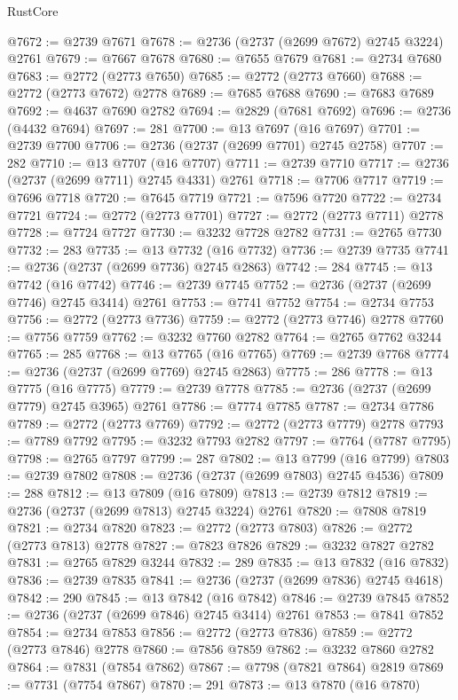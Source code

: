 \begin{lexlean}{RustCore}
\begin{coremodule}
@7672 := @2739 @7671
@7678 := @2736 (@2737 (@2699 @7672) @2745 @3224) @2761
@7679 := @7667 @7678
@7680 := @7655 @7679
@7681 := @2734 @7680
@7683 := @2772 (@2773 @7650)
@7685 := @2772 (@2773 @7660)
@7688 := @2772 (@2773 @7672) @2778
@7689 := @7685 @7688
@7690 := @7683 @7689
@7692 := @4637 @7690 @2782
@7694 := @2829 (@7681 @7692)
@7696 := @2736 (@4432 @7694)
@7697 := 281
@7700 := @13 @7697 (@16 @7697)
@7701 := @2739 @7700
@7706 := @2736 (@2737 (@2699 @7701) @2745 @2758)
@7707 := 282
@7710 := @13 @7707 (@16 @7707)
@7711 := @2739 @7710
@7717 := @2736 (@2737 (@2699 @7711) @2745 @4331) @2761
@7718 := @7706 @7717
@7719 := @7696 @7718
@7720 := @7645 @7719
@7721 := @7596 @7720
@7722 := @2734 @7721
@7724 := @2772 (@2773 @7701)
@7727 := @2772 (@2773 @7711) @2778
@7728 := @7724 @7727
@7730 := @3232 @7728 @2782
@7731 := @2765 @7730
@7732 := 283
@7735 := @13 @7732 (@16 @7732)
@7736 := @2739 @7735
@7741 := @2736 (@2737 (@2699 @7736) @2745 @2863)
@7742 := 284
@7745 := @13 @7742 (@16 @7742)
@7746 := @2739 @7745
@7752 := @2736 (@2737 (@2699 @7746) @2745 @3414) @2761
@7753 := @7741 @7752
@7754 := @2734 @7753
@7756 := @2772 (@2773 @7736)
@7759 := @2772 (@2773 @7746) @2778
@7760 := @7756 @7759
@7762 := @3232 @7760 @2782
@7764 := @2765 @7762 @3244
@7765 := 285
@7768 := @13 @7765 (@16 @7765)
@7769 := @2739 @7768
@7774 := @2736 (@2737 (@2699 @7769) @2745 @2863)
@7775 := 286
@7778 := @13 @7775 (@16 @7775)
@7779 := @2739 @7778
@7785 := @2736 (@2737 (@2699 @7779) @2745 @3965) @2761
@7786 := @7774 @7785
@7787 := @2734 @7786
@7789 := @2772 (@2773 @7769)
@7792 := @2772 (@2773 @7779) @2778
@7793 := @7789 @7792
@7795 := @3232 @7793 @2782
@7797 := @7764 (@7787 @7795)
@7798 := @2765 @7797
@7799 := 287
@7802 := @13 @7799 (@16 @7799)
@7803 := @2739 @7802
@7808 := @2736 (@2737 (@2699 @7803) @2745 @4536)
@7809 := 288
@7812 := @13 @7809 (@16 @7809)
@7813 := @2739 @7812
@7819 := @2736 (@2737 (@2699 @7813) @2745 @3224) @2761
@7820 := @7808 @7819
@7821 := @2734 @7820
@7823 := @2772 (@2773 @7803)
@7826 := @2772 (@2773 @7813) @2778
@7827 := @7823 @7826
@7829 := @3232 @7827 @2782
@7831 := @2765 @7829 @3244
@7832 := 289
@7835 := @13 @7832 (@16 @7832)
@7836 := @2739 @7835
@7841 := @2736 (@2737 (@2699 @7836) @2745 @4618)
@7842 := 290
@7845 := @13 @7842 (@16 @7842)
@7846 := @2739 @7845
@7852 := @2736 (@2737 (@2699 @7846) @2745 @3414) @2761
@7853 := @7841 @7852
@7854 := @2734 @7853
@7856 := @2772 (@2773 @7836)
@7859 := @2772 (@2773 @7846) @2778
@7860 := @7856 @7859
@7862 := @3232 @7860 @2782
@7864 := @7831 (@7854 @7862)
@7867 := @7798 (@7821 @7864) @2819
@7869 := @7731 (@7754 @7867)
@7870 := 291
@7873 := @13 @7870 (@16 @7870)

\end{coremodule}
\end{lexlean}
